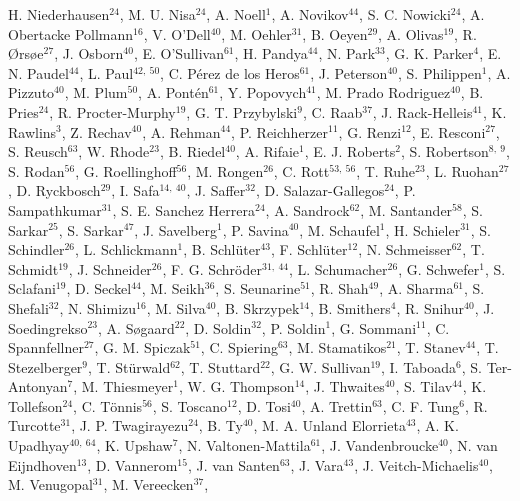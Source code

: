H. Niederhausen$^{24}$,
M. U. Nisa$^{24}$,
A. Noell$^{1}$,
A. Novikov$^{44}$,
S. C. Nowicki$^{24}$,
A. Obertacke Pollmann$^{16}$,
V. O'Dell$^{40}$,
M. Oehler$^{31}$,
B. Oeyen$^{29}$,
A. Olivas$^{19}$,
R. {\O}rs{\o}e$^{27}$,
J. Osborn$^{40}$,
E. O'Sullivan$^{61}$,
H. Pandya$^{44}$,
N. Park$^{33}$,
G. K. Parker$^{4}$,
E. N. Paudel$^{44}$,
L. Paul$^{42,\: 50}$,
C. P{\'e}rez de los Heros$^{61}$,
J. Peterson$^{40}$,
S. Philippen$^{1}$,
A. Pizzuto$^{40}$,
M. Plum$^{50}$,
A. Pont{\'e}n$^{61}$,
Y. Popovych$^{41}$,
M. Prado Rodriguez$^{40}$,
B. Pries$^{24}$,
R. Procter-Murphy$^{19}$,
G. T. Przybylski$^{9}$,
C. Raab$^{37}$,
J. Rack-Helleis$^{41}$,
K. Rawlins$^{3}$,
Z. Rechav$^{40}$,
A. Rehman$^{44}$,
P. Reichherzer$^{11}$,
G. Renzi$^{12}$,
E. Resconi$^{27}$,
S. Reusch$^{63}$,
W. Rhode$^{23}$,
B. Riedel$^{40}$,
A. Rifaie$^{1}$,
E. J. Roberts$^{2}$,
S. Robertson$^{8,\: 9}$,
S. Rodan$^{56}$,
G. Roellinghoff$^{56}$,
M. Rongen$^{26}$,
C. Rott$^{53,\: 56}$,
T. Ruhe$^{23}$,
L. Ruohan$^{27}$,
D. Ryckbosch$^{29}$,
I. Safa$^{14,\: 40}$,
J. Saffer$^{32}$,
D. Salazar-Gallegos$^{24}$,
P. Sampathkumar$^{31}$,
S. E. Sanchez Herrera$^{24}$,
A. Sandrock$^{62}$,
M. Santander$^{58}$,
S. Sarkar$^{25}$,
S. Sarkar$^{47}$,
J. Savelberg$^{1}$,
P. Savina$^{40}$,
M. Schaufel$^{1}$,
H. Schieler$^{31}$,
S. Schindler$^{26}$,
L. Schlickmann$^{1}$,
B. Schl{\"u}ter$^{43}$,
F. Schl{\"u}ter$^{12}$,
N. Schmeisser$^{62}$,
T. Schmidt$^{19}$,
J. Schneider$^{26}$,
F. G. Schr{\"o}der$^{31,\: 44}$,
L. Schumacher$^{26}$,
G. Schwefer$^{1}$,
S. Sclafani$^{19}$,
D. Seckel$^{44}$,
M. Seikh$^{36}$,
S. Seunarine$^{51}$,
R. Shah$^{49}$,
A. Sharma$^{61}$,
S. Shefali$^{32}$,
N. Shimizu$^{16}$,
M. Silva$^{40}$,
B. Skrzypek$^{14}$,
B. Smithers$^{4}$,
R. Snihur$^{40}$,
J. Soedingrekso$^{23}$,
A. S{\o}gaard$^{22}$,
D. Soldin$^{32}$,
P. Soldin$^{1}$,
G. Sommani$^{11}$,
C. Spannfellner$^{27}$,
G. M. Spiczak$^{51}$,
C. Spiering$^{63}$,
M. Stamatikos$^{21}$,
T. Stanev$^{44}$,
T. Stezelberger$^{9}$,
T. St{\"u}rwald$^{62}$,
T. Stuttard$^{22}$,
G. W. Sullivan$^{19}$,
I. Taboada$^{6}$,
S. Ter-Antonyan$^{7}$,
M. Thiesmeyer$^{1}$,
W. G. Thompson$^{14}$,
J. Thwaites$^{40}$,
S. Tilav$^{44}$,
K. Tollefson$^{24}$,
C. T{\"o}nnis$^{56}$,
S. Toscano$^{12}$,
D. Tosi$^{40}$,
A. Trettin$^{63}$,
C. F. Tung$^{6}$,
R. Turcotte$^{31}$,
J. P. Twagirayezu$^{24}$,
B. Ty$^{40}$,
M. A. Unland Elorrieta$^{43}$,
A. K. Upadhyay$^{40,\: 64}$,
K. Upshaw$^{7}$,
N. Valtonen-Mattila$^{61}$,
J. Vandenbroucke$^{40}$,
N. van Eijndhoven$^{13}$,
D. Vannerom$^{15}$,
J. van Santen$^{63}$,
J. Vara$^{43}$,
J. Veitch-Michaelis$^{40}$,
M. Venugopal$^{31}$,
M. Vereecken$^{37}$,
